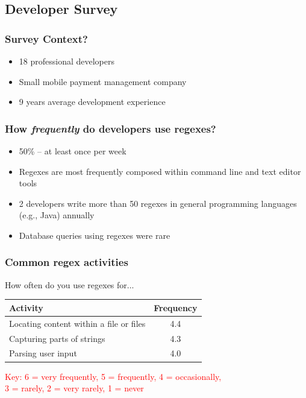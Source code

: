 \subsection{Developer Survey}

\begin{frame}
\frametitle{Survey Context?}

\begin{itemize}
	\item 18 professional developers 
	\item Small mobile payment management company
	\item 9 years average development experience
\end{itemize}
\end{frame}

\begin{frame}
\frametitle{How \emph{frequently} do developers use regexes?}

\begin{itemize}
	\item 50\%  -- at least once per week
	\item Regexes are most frequently composed within command line and text editor tools
	\item 2 developers write more than 50 regexes in general programming languages (e.g., Java) annually
	\item Database queries using regexes were rare
\end{itemize}
\end{frame}


\begin{frame}
\frametitle{Common regex activities}

\begin{block}{How often do you use regexes for... }

\begin{center}
\begin{tabular}{l|c}
\toprule
\textbf{Activity} & \textbf{Frequency} \\  \hline 
Locating content within a file or files & 4.4\\ \hline 
Capturing parts of strings & 4.3 \\ \hline 
Parsing user input & 4.0\\  
\bottomrule
\end{tabular}
\end{center}
\end{block}
\textcolor{red}{Key: 6 = very frequently, 5 = frequently, 4 = occasionally, \\3 = rarely, 2 = very rarely, 1 = never}

\end{frame}


